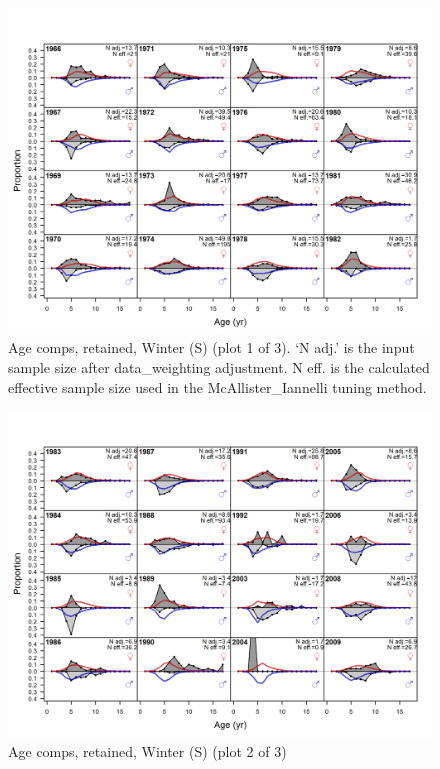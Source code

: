 \documentclass[12pt,]{article}
\begin{document}
\begin{figure}
\centering
\includegraphics{r4ss/plots_mod1/comp_agefit_flt3mkt2_page1.png}
\caption{Age comps, retained, Winter (S) (plot 1 of 3). `N adj.' is the
input sample size after data\_weighting adjustment. N eff. is the
calculated effective sample size used in the McAllister\_Iannelli tuning
method. \label{fig:age_fits}}
\end{figure}

\begin{figure}
\centering
\includegraphics{r4ss/plots_mod1/comp_agefit_flt3mkt2_page2.png}
\caption{Age comps, retained, Winter (S) (plot 2 of 3)
\label{fig:age_fits}}
\end{figure}
\end{document}
